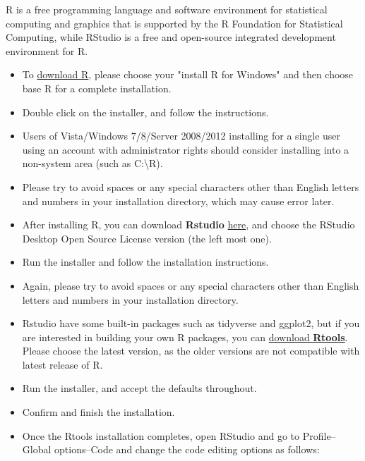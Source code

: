 \documentclass[11pt]{article} %
\begin{document}
    R is a free programming language and software environment for statistical computing and graphics that is supported by the R Foundation for Statistical Computing, while RStudio is a free and open-source integrated development environment for R. 
    \begin{itemize}
    	\item To \href{https://cran.r-project.org/}{download R}, please choose your "install R for Windows" and then choose base R for a complete installation. 
    	\item Double click on the installer, and follow the instructions. 
    	\item Users of Vista/Windows 7/8/Server 2008/2012 installing for a single user using an account with administrator rights should consider installing into a non-system area (such as C:\textbackslash R). 
    	\item Please try to avoid spaces or any special characters other than English letters and numbers in your installation directory, which may cause error later.
    	\item After installing R, you can download \textbf{Rstudio} \href{https://www.rstudio.com/products/rstudio/download/}{here}, and choose the RStudio Desktop Open Source License version (the left most one). 
    	\item Run the installer and follow the installation instructions.  
    	\item Again, please try to avoid spaces or any special characters other than English letters and numbers in your installation directory. 
    	\item Rstudio have some built-in packages such as tidyverse and ggplot2, but if you are interested in building your own R packages, you can \href{https://cran.r-project.org/bin/windows/Rtools/}{download \textbf{Rtools}}. Please choose the latest version, as the older versions are not compatible with latest release of R. 
    	\item Run the installer, and accept the defaults throughout. 
    	\item Confirm and finish the installation. 
    	\item Once the Rtools installation completes, open RStudio and go to Profile--Global options--Code and change the code editing options as follows:
    	

\end{itemize}
\end{document}
